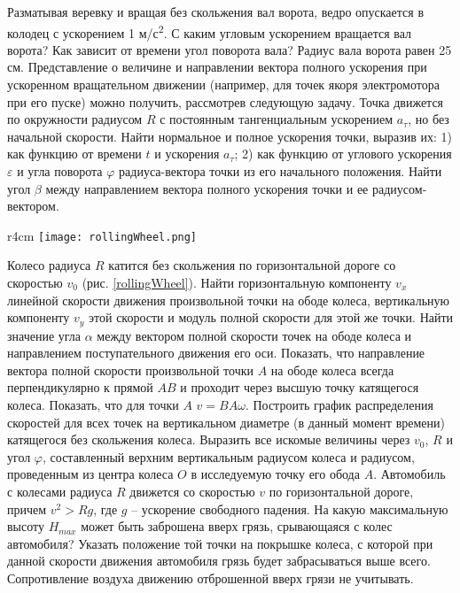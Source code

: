 \AddProb Разматывая веревку и вращая без скольжения вал ворота, ведро опускается в колодец с ускорением 1 м/с\textsuperscript{2}. С каким угловым ускорением вращается вал ворота? Как зависит от времени угол поворота вала? Радиус вала ворота равен 25 см.
\AddProb Представление о величине и направлении вектора полного ускорения при ускоренном вращательном движении (например, для точек якоря электромотора при его пуске) можно получить, рассмотрев следующую задачу. Точка движется по окружности радиусом $R$ с постоянным тангенциальным ускорением $a_{\tau}$, но без начальной скорости. Найти нормальное и полное ускорения точки, выразив их: 1) как функцию от времени $t$ и ускорения $a_{\tau}$; 2) как функцию от углового ускорения $\varepsilon$ и угла поворота $\varphi$ радиуса-вектора точки из его начального положения. Найти угол $\beta$ между направлением вектора полного ускорения точки и ее
радиусом-вектором.

\begin{wrapfigure}[10]{r}{4cm}
\texttt{[image: rollingWheel.png]}
\caption{}
\label{rollingWheel}
\end{wrapfigure}
\AddProb Колесо радиуса $R$ катится без скольжения по горизонтальной дороге со скоростью $v_0$ (рис. \ref{rollingWheel}). Найти горизонтальную компоненту $v_x$ линейной скорости движения произвольной точки на ободе колеса, вертикальную компоненту $v_y$ этой скорости и модуль полной скорости для этой же точки. Найти значение угла $\alpha$ между вектором полной скорости точек на ободе колеса и направлением поступательного движения его оси. Показать, что направление
вектора полной скорости произвольной точки $A$ на ободе колеса всегда перпендикулярно к прямой $AB$ и проходит через высшую точку катящегося колеса. Показать, что для точки $A$ $v = BA \omega$. Построить график распределения скоростей для всех точек на вертикальном диаметре (в данный момент времени) катящегося без скольжения колеса. Выразить все искомые величины через $v_0$, $R$ и угол $\varphi$, составленный верхним вертикальным радиусом колеса и радиусом, проведенным из
центра колеса $O$ в исследуемую точку его обода $A$.
\AddProb Автомобиль с колесами радиуса $R$ движется со скоростью $v$ по горизонтальной дороге, причем $v^2 > Rg$, где $g$ -- ускорение свободного падения. На какую максимальную высоту $H_{max}$ может быть заброшена вверх грязь, срывающаяся с колес автомобиля? Указать положение той
точки на покрышке колеса, с которой при данной скорости движения автомобиля грязь будет забрасываться выше всего. Сопротивление воздуха движению отброшенной вверх грязи не учитывать.

